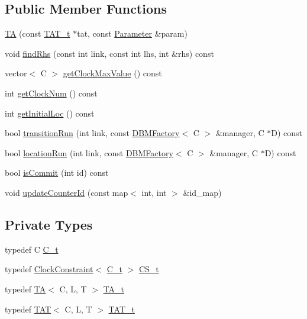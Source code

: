 \subsection*{Public Member Functions}
\begin{DoxyCompactItemize}
\item 
\mbox{\hyperlink{classgraphsat_1_1_t_a_a52ab20ea442cfeae66efc7aafdbd5e3e}{TA}} (const \mbox{\hyperlink{classgraphsat_1_1_t_a_a9d81348f6a488c20a885e5eed6cd8a14}{T\+A\+T\+\_\+t}} $\ast$tat, const \mbox{\hyperlink{classgraphsat_1_1_parameter}{Parameter}} \&param)
\item 
void \mbox{\hyperlink{classgraphsat_1_1_t_a_a9bbe8918a388658c5ee6c5fde5325a07}{find\+Rhs}} (const int link, const int lhs, int \&rhs) const
\item 
vector$<$ C $>$ \mbox{\hyperlink{classgraphsat_1_1_t_a_aea592f12c9c7cd0232c19a19fa268d25}{get\+Clock\+Max\+Value}} () const
\item 
int \mbox{\hyperlink{classgraphsat_1_1_t_a_a5c6fed7d2a3e06cb221049fb42eb1800}{get\+Clock\+Num}} () const
\item 
int \mbox{\hyperlink{classgraphsat_1_1_t_a_a26f74ce62e8b0e5a73fed0302c73781d}{get\+Initial\+Loc}} () const
\item 
bool \mbox{\hyperlink{classgraphsat_1_1_t_a_a6c73bfefdea0464e1948377f21905499}{transition\+Run}} (int link, const \mbox{\hyperlink{classgraphsat_1_1_d_b_m_factory}{D\+B\+M\+Factory}}$<$ C $>$ \&manager, C $\ast$D) const
\item 
bool \mbox{\hyperlink{classgraphsat_1_1_t_a_a4418595d16f065eafd066e0b2dd2b48f}{location\+Run}} (int link, const \mbox{\hyperlink{classgraphsat_1_1_d_b_m_factory}{D\+B\+M\+Factory}}$<$ C $>$ \&manager, C $\ast$D) const
\item 
bool \mbox{\hyperlink{classgraphsat_1_1_t_a_ad62ce2c1a51636c96fe5205dbaba14cd}{is\+Commit}} (int id) const
\item 
void \mbox{\hyperlink{classgraphsat_1_1_t_a_ac3eb735aa539ad827c65930526effa07}{update\+Counter\+Id}} (const map$<$ int, int $>$ \&id\+\_\+map)
\end{DoxyCompactItemize}
\subsection*{Private Types}
\begin{DoxyCompactItemize}
\item 
typedef C \mbox{\hyperlink{classgraphsat_1_1_t_a_afa30a66edcc3f3f9126c70aa82db1ea3}{C\+\_\+t}}
\item 
typedef \mbox{\hyperlink{classgraphsat_1_1_clock_constraint}{Clock\+Constraint}}$<$ \mbox{\hyperlink{classgraphsat_1_1_t_a_afa30a66edcc3f3f9126c70aa82db1ea3}{C\+\_\+t}} $>$ \mbox{\hyperlink{classgraphsat_1_1_t_a_a2a1d47f0a2945d673fc15125b3ff2f25}{C\+S\+\_\+t}}
\item 
typedef \mbox{\hyperlink{classgraphsat_1_1_t_a}{TA}}$<$ C, L, T $>$ \mbox{\hyperlink{classgraphsat_1_1_t_a_a4ebfe8e97e7ce6681d5f237e322c4a77}{T\+A\+\_\+t}}
\item 
typedef \mbox{\hyperlink{classgraphsat_1_1_t_a_t}{T\+AT}}$<$ C, L, T $>$ \mbox{\hyperlink{classgraphsat_1_1_t_a_a9d81348f6a488c20a885e5eed6cd8a14}{T\+A\+T\+\_\+t}}
\end{DoxyCompactItemize}
